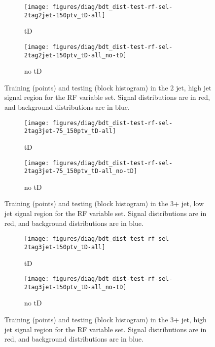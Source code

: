 {\begin{figure}[!htbp]\captionsetup{justification=centering}
  \centering
  \begin{subfigure}[t]{0.49\textwidth}\centering\texttt{[image: figures/diag/bdt\_dist-test-rf-sel-2tag2jet-150ptv\_tD-all]}\caption{tD}\end{subfigure}
  \begin{subfigure}[t]{0.49\textwidth}\centering\texttt{[image: figures/diag/bdt\_dist-test-rf-sel-2tag2jet-150ptv\_tD-all\_no-tD]}\caption{no tD}\end{subfigure}
  \caption{Training (points) and testing (block histogram) in the 2 jet, high jet signal region for the RF variable set.  Signal distributions are in red, and background distributions are in blue.}
  \label{fig:rf-sel2jet-150ptv-testing}
\end{figure}

\begin{figure}[!htbp]\captionsetup{justification=centering}
  \centering
  \begin{subfigure}[t]{0.49\textwidth}\centering\texttt{[image: figures/diag/bdt\_dist-test-rf-sel-2tag3jet-75\_150ptv\_tD-all]}\caption{tD}\end{subfigure}
  \begin{subfigure}[t]{0.49\textwidth}\centering\texttt{[image: figures/diag/bdt\_dist-test-rf-sel-2tag3jet-75\_150ptv\_tD-all\_no-tD]}\caption{no tD}\end{subfigure}
  \caption{Training (points) and testing (block histogram) in the 3+ jet, low jet signal region for the RF variable set.  Signal distributions are in red, and background distributions are in blue.}
  \label{fig:rf-sel3jet-75_150ptv-testing}
\end{figure}

\begin{figure}[!htbp]\captionsetup{justification=centering}
  \centering
  \begin{subfigure}[t]{0.49\textwidth}\centering\texttt{[image: figures/diag/bdt\_dist-test-rf-sel-2tag3jet-150ptv\_tD-all]}\caption{tD}\end{subfigure}
  \begin{subfigure}[t]{0.49\textwidth}\centering\texttt{[image: figures/diag/bdt\_dist-test-rf-sel-2tag3jet-150ptv\_tD-all\_no-tD]}\caption{no tD}\end{subfigure}
  \caption{Training (points) and testing (block histogram) in the 3+ jet, high jet signal region for the RF variable set.  Signal distributions are in red, and background distributions are in blue.}
  \label{fig:rf-sel3jet-150ptv-testing}
\end{figure}

}
